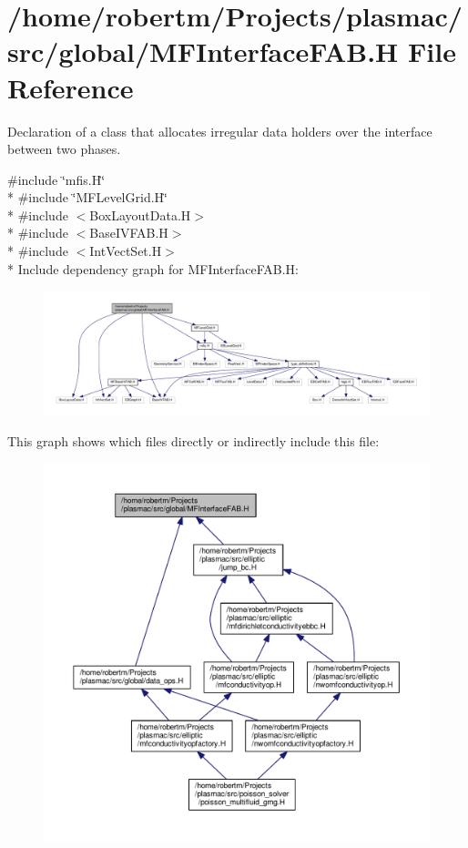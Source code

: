 \hypertarget{MFInterfaceFAB_8H}{}\section{/home/robertm/\+Projects/plasmac/src/global/\+M\+F\+Interface\+F\+AB.H File Reference}
\label{MFInterfaceFAB_8H}


Declaration of a class that allocates irregular data holders over the interface between two phases.  


{\ttfamily \#include \char`\"{}mfis.\+H\char`\"{}}\\*
{\ttfamily \#include \char`\"{}M\+F\+Level\+Grid.\+H\char`\"{}}\\*
{\ttfamily \#include $<$Box\+Layout\+Data.\+H$>$}\\*
{\ttfamily \#include $<$Base\+I\+V\+F\+A\+B.\+H$>$}\\*
{\ttfamily \#include $<$Int\+Vect\+Set.\+H$>$}\\*
Include dependency graph for M\+F\+Interface\+F\+A\+B.\+H\+:\nopagebreak
\begin{figure}[H]
\begin{center}
\leavevmode
\includegraphics[width=350pt]{MFInterfaceFAB_8H__incl}
\end{center}
\end{figure}
This graph shows which files directly or indirectly include this file\+:\nopagebreak
\begin{figure}[H]
\begin{center}
\leavevmode
\includegraphics[width=350pt]{MFInterfaceFAB_8H__dep__incl}
\end{center}
\end{figure}
